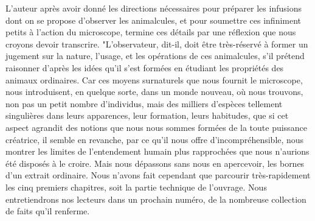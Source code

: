 L'auteur après avoir donné les directions nécessaires pour préparer les infusions dont on se propose d'observer les animalcules, et pour soumettre ces infiniment petits à l'action du microscope, termine ces détails par une réflexion que nous croyons devoir transcrire.
"L'observateur, dit-il, doit être très-réservé à former un jugement sur la nature, l'usage, et les opérations de ces animalcules, s'il prétend raisonner d'après les idées qu'il s'est formées en étudiant les propriétés des animaux ordinaires. Car ces moyens surnaturels que nous fournit le microscope, nous introduisent, en quelque sorte, dans un monde nouveau, où nous trouvons, non pas un petit nombre d'individus, mais des milliers d'espèces tellement singulières dans leurs apparences, leur formation,\setcounter{page}{228} leurs habitudes, que si cet aspect agrandit des notions que nous nous sommes formées de la toute puissance créatrice, il semble en revanche, par ce qu'il nous offre d'incompréhensible, nous montrer les limites de l'entendement humain plus rapprochées que nous n'aurions été disposés à le croire.
Mais nous dépassons sans nous en apercevoir, les bornes d'un extrait ordinaire. Nous n'avons fait cependant que parcourir très-rapidement les cinq premiers chapitres, soit la partie technique de l'ouvrage. Nous entretiendrons nos lecteurs dans un prochain numéro, de la nombreuse collection de faits qu'il renferme.
